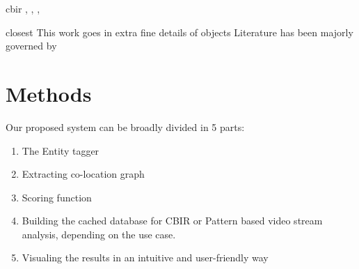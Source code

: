 \documentclass[conference]{IEEEtran}
\begin{document}
{  
 \cite{graph-semantic-hashing}
 \cite{semantic-image-distance} 
 
 cbir \cite{visual-features}, 
 \cite{multi-attribute-image-rank},
 \cite{label-image-rank} ,
 \cite{weak-image-rank}
 \cite{attribute-anomaly}
 \cite{semantic-image-tag} 
 \cite{semantic-graph} 
 
 closest \cite{attribute-graph} 
 This work goes in extra fine details of objects
 Literature has been majorly governed by 

\section{Methods}
Our proposed system can be broadly divided in 5 parts: 
    \begin{enumerate}
            \item The Entity tagger
            \item Extracting co-location graph
            \item Scoring function
            \item Building the cached database for CBIR or Pattern based video stream analysis, depending on the use case. 
            \item Visualing the results in an intuitive and user-friendly way
    \end{enumerate}
    
}
\end{document}

